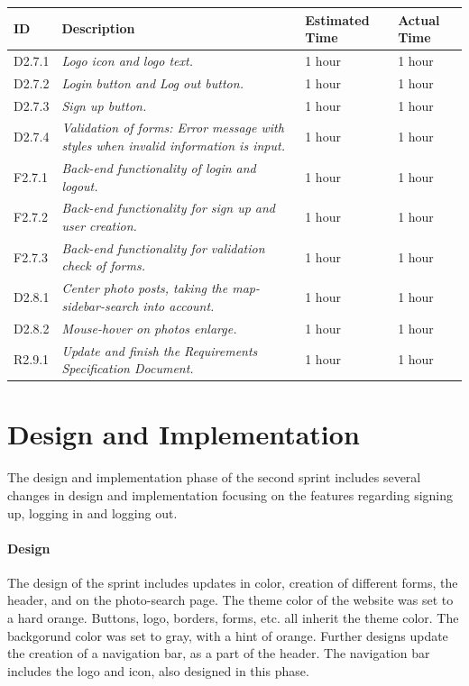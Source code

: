 \begin{minipage}{\linewidth}
\setlength{\tabcolsep}{12pt}
\centering
{}
\begin{tabular}{|p{1cm}|p{4cm}|p{2cm}|p{2cm}|}
\hline
\cellcolor{gray!25} ID & \cellcolor{gray!25} Description & \cellcolor{gray!25} Estimated Time & \cellcolor{gray!25} Actual Time \\
\hline
D2.7.1 & \it{Logo icon and logo text.} & 1 hour & 1 hour \\
D2.7.2 & \it{Login button and Log out button.} & 1 hour & 1 hour \\
D2.7.3 & \it{Sign up button.} & 1 hour & 1 hour \\
D2.7.4 & \it{Validation of forms: Error message with styles when invalid information is input.} & 1 hour & 1 hour \\
F2.7.1 & \it{Back-end functionality of login and logout.} & 1 hour & 1 hour \\
F2.7.2 & \it{Back-end functionality for sign up and user creation.} & 1 hour & 1 hour \\
F2.7.3 & \it{Back-end functionality for validation check of forms.} & 1 hour & 1 hour \\
D2.8.1 & \it{Center photo posts, taking the map-sidebar-search into account.} & 1 hour & 1 hour \\
D2.8.2 & \it{Mouse-hover on photos enlarge.} & 1 hour & 1 hour \\
R2.9.1 & \it{Update and finish the Requirements Specification Document.} & 1 hour & 1 hour \\
\hline
\end{tabular}
\end{minipage}


\section{Design and Implementation} 
The design and implementation phase of the second sprint includes several changes in design and implementation focusing on the features regarding signing up, logging in and logging out. 

\paragraph{Design}
The design of the sprint includes updates in color, creation of different forms, the header, and on the photo-search page. The theme color of the website was set to a hard orange. Buttons, logo, borders, forms, etc. all inherit the theme color. The backgorund color was set to gray, with a hint of orange. Further designs update the creation of a navigation bar, as a part of the header. The navigation bar includes the logo and icon, also designed in this phase. \\


